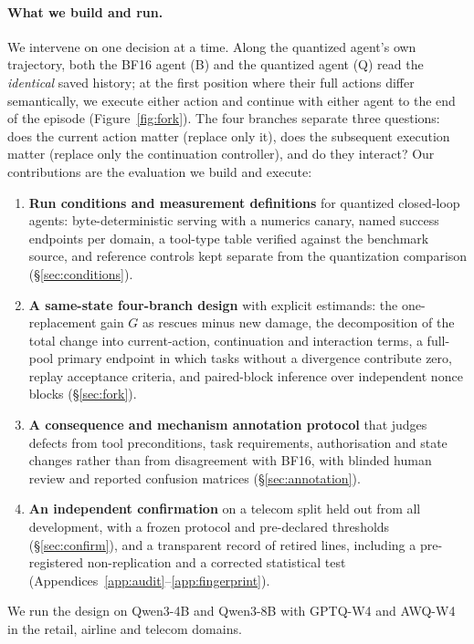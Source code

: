 \paragraph{What we build and run.} We intervene on one decision at a time. Along the quantized agent's own trajectory, both the BF16 agent (B) and the quantized agent (Q) read the \emph{identical} saved history; at the first position where their full actions differ semantically, we execute either action and continue with either agent to the end of the episode (Figure~\ref{fig:fork}). The four branches separate three questions: does the current action matter (replace only it), does the subsequent execution matter (replace only the continuation controller), and do they interact? Our contributions are the evaluation we build and execute:
\begin{enumerate}[leftmargin=*,itemsep=1pt,topsep=2pt]
\item \textbf{Run conditions and measurement definitions} for quantized closed-loop agents: byte-deterministic serving with a numerics canary, named success endpoints per domain, a tool-type table verified against the benchmark source, and reference controls kept separate from the quantization comparison (\S\ref{sec:conditions}).
\item \textbf{A same-state four-branch design} with explicit estimands: the one-replacement gain $G$ as rescues minus new damage, the decomposition of the total change into current-action, continuation and interaction terms, a full-pool primary endpoint in which tasks without a divergence contribute zero, replay acceptance criteria, and paired-block inference over independent nonce blocks (\S\ref{sec:fork}).
\item \textbf{A consequence and mechanism annotation protocol} that judges defects from tool preconditions, task requirements, authorisation and state changes rather than from disagreement with BF16, with blinded human review and reported confusion matrices (\S\ref{sec:annotation}).
\item \textbf{An independent confirmation} on a telecom split held out from all development, with a frozen protocol and pre-declared thresholds (\S\ref{sec:confirm}), and a transparent record of retired lines, including a pre-registered non-replication and a corrected statistical test (Appendices~\ref{app:audit}--\ref{app:fingerprint}).
\end{enumerate}
We run the design on Qwen3-4B and Qwen3-8B with GPTQ-W4 and AWQ-W4 in the \tautwo{} retail, airline and telecom domains. 

